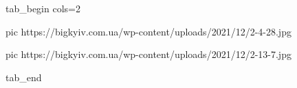  
 
 
 
 


\ifcmt
  tab_begin cols=2

     pic https://bigkyiv.com.ua/wp-content/uploads/2021/12/2-4-28.jpg

     pic https://bigkyiv.com.ua/wp-content/uploads/2021/12/2-13-7.jpg

  tab_end
\fi
